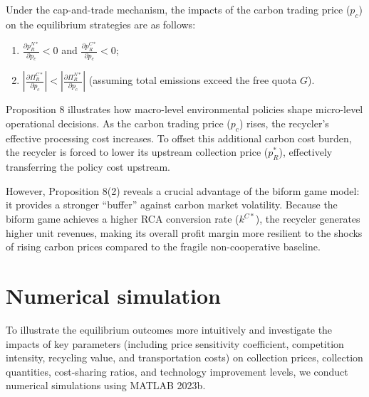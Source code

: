 \documentclass[authoryear,preprint,review,times,10pt]{elsarticle}
\begin{document}
\begin{prop}
\label{prop:carbon_impact}
Under the cap-and-trade mechanism, the impacts of the carbon trading price ($p_{c}$) on the equilibrium strategies are as follows:
\begin{enumerate}[label={(\arabic*)}]
\item $\frac{\partial p_{R}^{N*}}{\partial p_{c}} < 0$ and $\frac{\partial p_{R}^{C*}}{\partial p_{c}} < 0$;
\item $|\frac{\partial \Pi_{R}^{C*}}{\partial p_{c}}| < |\frac{\partial \Pi_{R}^{N*}}{\partial p_{c}}|$ (assuming total emissions exceed the free quota $G$).
\end{enumerate}
\end{prop}

Proposition 8 illustrates how macro-level environmental policies shape micro-level operational decisions. As the carbon trading price ($p_{c}$) rises, the recycler's effective processing cost increases. To offset this additional carbon cost burden, the recycler is forced to lower its upstream collection price ($p_{R}^*$), effectively transferring the policy cost upstream.

However, Proposition 8(2) reveals a crucial advantage of the biform game model: it provides a stronger ``buffer'' against carbon market volatility. Because the biform game achieves a higher RCA conversion rate ($k^{C*}$), the recycler generates higher unit revenues, making its overall profit margin more resilient to the shocks of rising carbon prices compared to the fragile non-cooperative baseline.

\section{Numerical simulation}
To illustrate the equilibrium outcomes more intuitively and investigate the impacts of key parameters (including price sensitivity coefficient, competition intensity, recycling value, and transportation costs) on collection prices, collection quantities, cost-sharing ratios, and technology improvement levels, we conduct numerical simulations using MATLAB 2023b.
\end{document}
